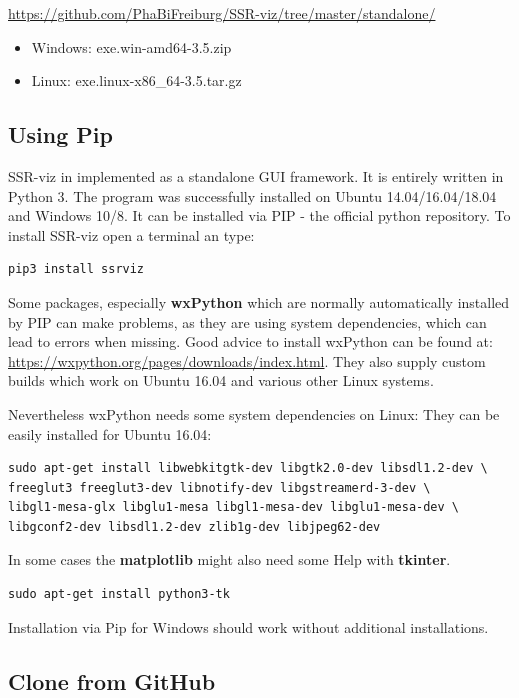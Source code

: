 \documentclass[a4paper,10pt]{article}
\begin{document}
\url{https://github.com/PhaBiFreiburg/SSR-viz/tree/master/standalone/}

\begin{itemize}
\item{Windows: exe.win-amd64-3.5.zip}
\item{Linux: exe.linux-x86\_64-3.5.tar.gz}
\end{itemize}


\subsection{Using Pip}

SSR-viz in implemented as a standalone GUI framework. It is entirely 
written in Python 3. The program was successfully installed on
Ubuntu 14.04/16.04/18.04 and Windows 10/8. It can be installed via PIP - the official python repository. 
To install SSR-viz open a terminal an type: 

\begin{verbatim}
pip3 install ssrviz
\end{verbatim}

Some packages, especially \textbf{wxPython} 
which are normally automatically installed
by PIP can make problems, as they are using system dependencies, which can 
lead to errors when missing. 
Good advice to install wxPython can be 
found at: \url{https://wxpython.org/pages/downloads/index.html}.
They also supply custom builds which work on Ubuntu 16.04 and various other
Linux systems.

Nevertheless wxPython needs some system dependencies on Linux:
They can be easily installed for Ubuntu 16.04:

\begin{verbatim}
sudo apt-get install libwebkitgtk-dev libgtk2.0-dev libsdl1.2-dev \
freeglut3 freeglut3-dev libnotify-dev libgstreamerd-3-dev \
libgl1-mesa-glx libglu1-mesa libgl1-mesa-dev libglu1-mesa-dev \
libgconf2-dev libsdl1.2-dev zlib1g-dev libjpeg62-dev
\end{verbatim}

In some cases the \textbf{matplotlib} might also need some Help with \textbf{tkinter}.

\begin{verbatim}
sudo apt-get install python3-tk
\end{verbatim}

Installation via Pip for Windows should work without additional installations.

\subsection{Clone from GitHub}
\end{document}

